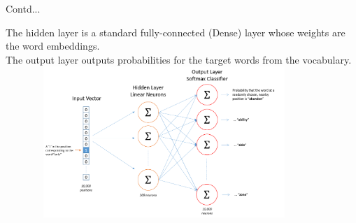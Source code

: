 \documentclass{beamer}
\begin{document}
\begin{frame}{Contd...}
\begin{flushleft}
		The hidden layer is a standard fully-connected (Dense) layer whose weights are the word embeddings.\\
		\vspace{10pt}
The output layer outputs probabilities for the target words from the vocabulary.\\
\includegraphics[height=5.7cm, width=12cm]{skip_gram_net_arch}
\end{flushleft}
\end{frame}
\end{document}
